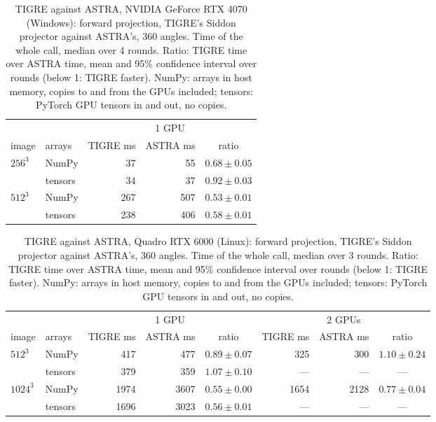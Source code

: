 \begin{table}[h]
\centering
\caption{\label{tab:astra-windows}TIGRE against ASTRA, NVIDIA GeForce RTX 4070 (Windows): forward projection, TIGRE's Siddon projector against ASTRA's, 360 angles. Time of the whole call, median over 4 rounds. Ratio: TIGRE time over ASTRA time, mean and 95\% confidence interval over rounds (below 1: TIGRE faster). NumPy: arrays in host memory, copies to and from the GPUs included; tensors: PyTorch GPU tensors in and out, no copies.}
\small\setlength{\tabcolsep}{4pt}
\begin{tabular}{llrrc}
\toprule
& & \multicolumn{3}{c}{1 GPU}\\
\cmidrule(lr){3-5}
image & arrays & TIGRE ms & ASTRA ms & ratio\\
\midrule
$256^3$ & NumPy & 37 & 55 & $0.68\pm0.05$\\
 & tensors & 34 & 37 & $0.92\pm0.03$\\
$512^3$ & NumPy & 267 & 507 & $0.53\pm0.01$\\
 & tensors & 238 & 406 & $0.58\pm0.01$\\
\bottomrule
\end{tabular}
\end{table}

\begin{table}[h]
\centering
\caption{\label{tab:astra-linux}TIGRE against ASTRA, Quadro RTX 6000 (Linux): forward projection, TIGRE's Siddon projector against ASTRA's, 360 angles. Time of the whole call, median over 3 rounds. Ratio: TIGRE time over ASTRA time, mean and 95\% confidence interval over rounds (below 1: TIGRE faster). NumPy: arrays in host memory, copies to and from the GPUs included; tensors: PyTorch GPU tensors in and out, no copies.}
\small\setlength{\tabcolsep}{4pt}
\begin{tabular}{llrrcrrc}
\toprule
& & \multicolumn{3}{c}{1 GPU} & \multicolumn{3}{c}{2 GPUs}\\
\cmidrule(lr){3-5}\cmidrule(lr){6-8}
image & arrays & TIGRE ms & ASTRA ms & ratio & TIGRE ms & ASTRA ms & ratio\\
\midrule
$512^3$ & NumPy & 417 & 477 & $0.89\pm0.07$ & 325 & 300 & $1.10\pm0.24$\\
 & tensors & 379 & 359 & $1.07\pm0.10$ & --- & --- & ---\\
$1024^3$ & NumPy & 1974 & 3607 & $0.55\pm0.00$ & 1654 & 2128 & $0.77\pm0.04$\\
 & tensors & 1696 & 3023 & $0.56\pm0.01$ & --- & --- & ---\\
\bottomrule
\end{tabular}
\end{table}
